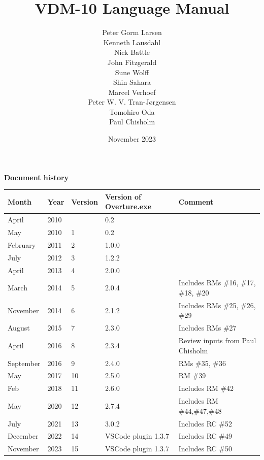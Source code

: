 \documentclass{overturerepchap}
\begin{document}
\title{VDM-10 Language Manual}
\author{Peter Gorm Larsen\\
        Kenneth Lausdahl\\
        Nick Battle\\
        John Fitzgerald\\
        Sune Wolff\\
        Shin Sahara\\
        Marcel Verhoef\\
        Peter W. V. Tran-J\o{}rgensen\\
        Tomohiro Oda\\
        Paul Chisholm}

\date{November 2023}

\maketitle


{\textbf{Document history}}

\begin{tabular}{|l|l|l|l|l|}\hline
Month   & Year & Version & Version of Overture.exe & Comment \\ \hline
April   & 2010 &         & 0.2   & \\ \hline
May     & 2010 & 1       & 0.2   &  \\ \hline
February& 2011 & 2       & 1.0.0 &  \\ \hline
July    & 2012 & 3       & 1.2.2 & \\ \hline
April   & 2013 & 4       & 2.0.0 & \\ \hline
March & 2014 & 5 & 2.0.4 &
Includes RMs \#16, \#17, \#18, \#20 \\ \hline
November & 2014 & 6 & 2.1.2 &
Includes RMs \#25, \#26, \#29 \\ \hline
August & 2015 & 7 & 2.3.0 &
Includes RMs \#27 \\ \hline
April & 2016 & 8 & 2.3.4 & Review inputs from Paul Chisholm \\ \hline
September & 2016 & 9 & 2.4.0 & RMs \#35, \#36 \\ \hline
May & 2017 & 10 & 2.5.0 & RM \#39\\ \hline
Feb & 2018 & 11 & 2.6.0 & Includes RM \#42 \\ \hline
May & 2020 & 12 & 2.7.4 & Includes RM \#44,\#47,\#48 \\ \hline
July & 2021 & 13 & 3.0.2 & Includes RC \#52 \\ \hline
December & 2022 & 14 & VSCode plugin 1.3.7 & Includes RC \#49 \\ \hline
November & 2023 & 15 & VSCode plugin 1.3.7 & Includes RC \#50 \\ \hline
\end{tabular}
\end{document}
